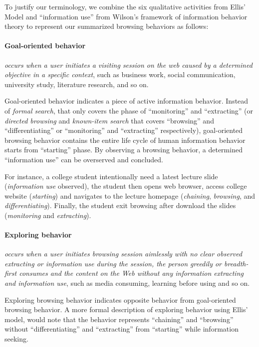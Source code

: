 To justify our terminology, we combine the six qualitative activities from Ellis' Model 
\cite{ellis1989behavioural} and ``information use'' from Wilson's framework 
\cite{wilson1997information} of information behavior theory 
to represent our summarized browsing behaviors as follows:

\paragraph{Goal-oriented behavior} \emph{occurs when a user initiates 
a visiting session on the web caused by a determined objective in a specific context}, 
such as business work, 
social communication, university study, literature research, and so on. 

Goal-oriented behavior indicates a piece of active information behavior.
Instead of \emph{formal search}, that only covers the phase of ``monitoring'' and ``extracting''
(or \emph{directed browsing} and \emph{known-item search} that covers ``browsing'' and ``differentiating'' or 
``monitoring'' and ``extracting'' respectively), 
goal-oriented browsing behavior contains the entire life cycle of human information behavior starts
from ``starting'' phase. By observing a browsing behavior, a determined ``information use'' 
can be overserved and concluded.

For instance, a college student intentionally need a latest lecture slide (\emph{information use} observed), 
the student then opens web browser, access college website (\emph{starting}) and navigates to the lecture homepage 
(\emph{chaining}, \emph{browsing}, and \emph{differentiating}).
Finally, the student exit browsing after download the slides (\emph{monitoring} and \emph{extracting}).

\paragraph{Exploring behavior} \emph{occurs when a user initiates browsing session 
aimlessly with no clear observed extracting or information use during the session, 
the person greedily or breadth-first consumes and the content on the Web without 
any information extracting and information use}, such as media consuming, learning 
before using and so on.

Exploring browsing behavior indicates opposite behavior from 
goal-oriented browsing behavior. A more formal description of exploring behavior using Ellis' model, 
would note that the behavior represents ``chaining'' and ``browsing''
without ``differentiating'' and ``extracting'' from ``starting'' while information seeking.

